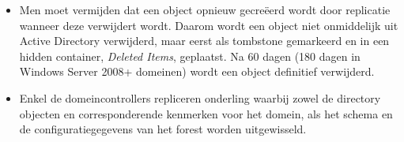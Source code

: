 \documentclass{report}
\begin{document}
\begin{enumerate}
{\begin{itemize}
				\item Men moet vermijden dat een object opnieuw gecreëerd wordt door replicatie wanneer deze verwijdert wordt. Daarom wordt een object niet onmiddelijk uit Active Directory verwijderd, maar eerst als tombstone gemarkeerd en in een hidden container, \textit{Deleted Items}, geplaatst. Na 60 dagen (180 dagen in Windows Server 2008+ domeinen) wordt een object definitief verwijderd. 
			\end{itemize}
		}
		
		 {
			\begin{itemize}
				\item Enkel de domeincontrollers repliceren onderling waarbij zowel de directory objecten en corresponderende kenmerken voor het domein, als het schema en de configuratiegegevens van het forest worden uitgewisseld.
			\end{itemize}

		}
		

\end{enumerate}
\end{document}
